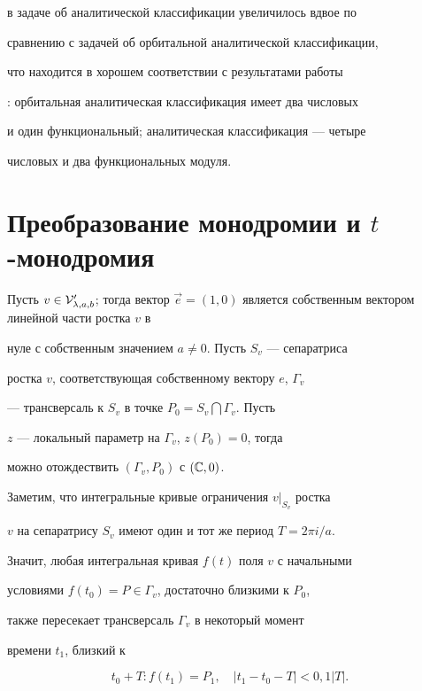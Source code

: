 в задаче об аналитической классификации увеличилось вдвое по


сравнению с задачей об орбитальной аналитической классификации,


что находится в хорошем соответствии с результатами работы


\cite{3}: орбитальная аналитическая классификация имеет два числовых


и один функциональный; аналитическая классификация --- четыре


числовых и два функциональных модуля.





\section{Преобразование монодромии и $t$-монодромия}





Пусть $v\in \V'_{\lambda,a,b}$; тогда вектор $\Vec


e=(1,0)$ является собственным вектором линейной части ростка $v$ в


нуле с собственным значением $a\ne 0$. Пусть $S_v$ --- сепаратриса


ростка $v$, соответствующая собственному вектору $e$, $\Gamma_v$


--- трансверсаль к $S_v$ в точке $P_0=S_v\bigcap \Gamma_v$. Пусть


$z$ --- локальный параметр на $\Gamma_v$, $z(P_0)=0$, тогда


можно отождествить $(\Gamma_v,P_0)$ с $(\Bbb C,0)$.





Заметим, что интегральные кривые ограничения $v|_{S_v}$ ростка


$v$ на сепаратрису $S_v$ имеют один и тот же период $T=2\pi i/a$.


Значит, любая интегральная кривая $f(t)$ поля $v$ с начальными


условиями $f(t_0)=P\in \Gamma_v$, достаточно близкими к $P_0$,


также пересекает трансверсаль $\Gamma_v$ в некоторый момент


времени $t_1$, близкий к


$$


t_0+T : f(t_1)=P_1,\quad |t_1-t_0-T|<0,1|T|.


$$





